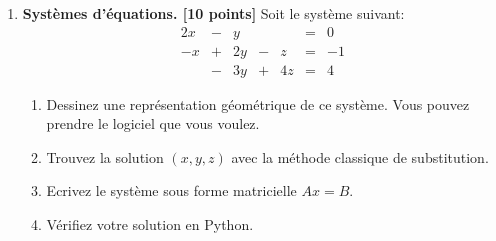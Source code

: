 \documentclass{article}
\begin{document}
\begin{enumerate}
\vspace{1cm}
\item {\bf Systèmes d'équations. [10 points]} Soit le système suivant:
$$
\begin{array}{ccccccc}
2x & - & y  &   &    & = &  0 \\
-x & + & 2y & - & z  & = & -1 \\
   & - & 3y & + & 4z & = &  4
\end{array}
$$
\begin{enumerate}
 \item Dessinez une représentation géométrique de ce système. Vous
   pouvez prendre le logiciel que vous voulez. 
 \item Trouvez la solution $(x,y,z)$ avec la méthode 
   classique de substitution.
 \item Ecrivez le système sous forme matricielle $A x = B$.
 \item Vérifiez votre solution en Python.
\end{enumerate}
      



\vspace{1cm}


\end{enumerate}
\end{document}
